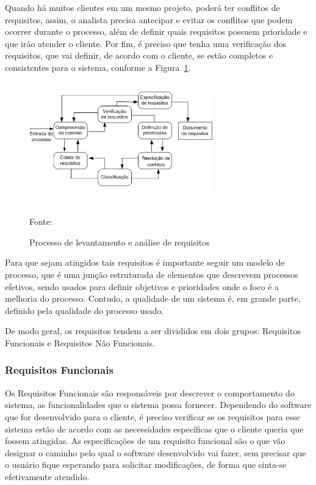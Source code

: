 Quando há muitos clientes em um mesmo projeto, poderá ter conflitos de requisitos, assim, o analista precisa antecipar e evitar os conflitos que podem ocorrer durante o processo, além de definir quais requisitos possuem prioridade e que irão atender o cliente. Por fim, é preciso que tenha uma verificação dos requisitos, que vai definir, de acordo com o cliente, se estão completos e consistentes para o sistema, conforme a Figura~\hypersetup{linkcolor=black}\ref{fig:Processo}.

\begin{figure}[!h]
	\centering
	\caption{Processo de levantamento e análise de requisitos }
	\includegraphics[width=300px, height=200px]{./images/2-10.jpg}
	\label{fig:Processo}
	\par{Fonte: \cite{sommerville}}
\end{figure}
\newpage
Para que sejam atingidos tais requisitos é importante seguir um modelo de processo, que é uma junção estruturada de elementos que descrevem processos efetivos, sendo usados para definir objetivos e prioridades onde o foco é a melhoria do processo. Contudo, a qualidade de um sistema é, em grande parte, definido pela qualidade do processo usado.

De modo geral, os requisitos tendem a ser divididos em dois grupos: Requisitos Funcionais e Requisitos Não Funcionais.

\subsubsection{Requisitos Funcionais}

Os Requisitos Funcionais são responsáveis por descrever o comportamento do sistema, as funcionalidades que o sistema possa fornecer. Dependendo do software que for desenvolvido para o cliente, é preciso verificar se os requisitos para esse sistema estão de acordo com as necessidades específicas que o cliente queria que fossem atingidas. As especificações de um requisito funcional são o que vão designar o caminho pelo qual o software desenvolvido vai fazer, sem precisar que o usuário fique esperando para solicitar modificações, de forma que sinta-se efetivamente atendido.

